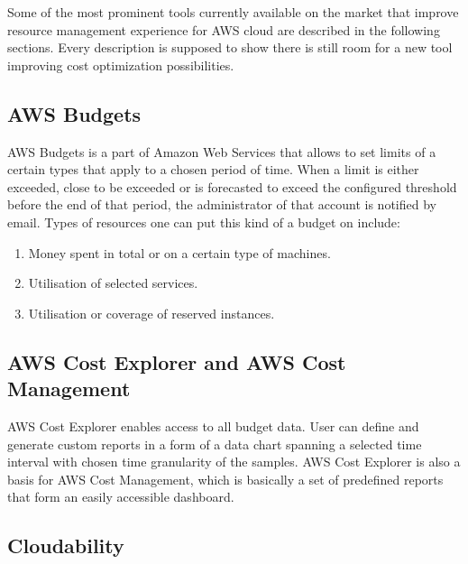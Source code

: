 \documentclass[licencjacka,en]{thesisclass}
\begin{document}
        Some of the most prominent tools currently available on the market that improve resource management experience for AWS cloud are described in the following sections. Every description is supposed to show there is still room for a new tool improving cost optimization possibilities.

        \subsection{AWS Budgets}

        AWS Budgets is a part of Amazon Web Services that allows to set limits of a certain types
        that apply to a chosen period of time. When a limit is either exceeded,
        close to be exceeded or is forecasted to exceed the configured threshold before the end of that period,
        the administrator of that account is notified by email. Types of resources one can put this kind of a budget on include:

        \begin{enumerate}
            \item Money spent in total or on a certain type of machines.
            \item Utilisation of selected services.
            \item Utilisation or coverage of reserved instances.
        \end{enumerate}
	\begin{flushright}
		\cite{AWSDocs}
	\end{flushright}

        \subsection{AWS Cost Explorer and AWS Cost Management}

	AWS Cost Explorer enables access to all budget data. User can define and generate custom reports in a form of a data chart spanning a selected time interval with chosen time granularity of the samples.
	AWS Cost Explorer is also a basis for AWS Cost Management, which is basically a set of predefined reports that form an easily accessible dashboard.

	\subsection{Cloudability}
\end{document}

